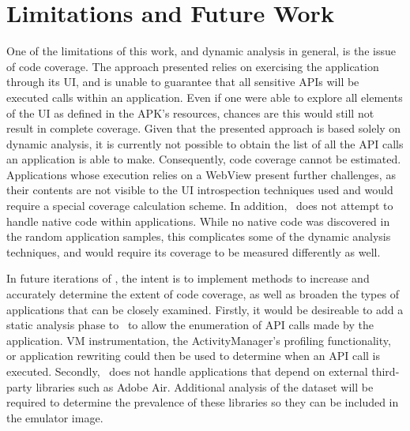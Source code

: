 \chapter{Limitations and Future Work}
\label{sec:future}

One of the limitations of this work, and dynamic analysis in general, is the issue of code coverage.  The approach presented relies on exercising the application through its UI, and is unable to guarantee that all sensitive APIs will be executed calls within an application. Even if one were able to explore all elements of the UI as defined in the APK's resources, chances are this would still not result in complete coverage.  Given that the presented approach is based solely on dynamic analysis, it is currently not possible to obtain the list of all the API calls an application is able to make. Consequently, code coverage cannot be estimated.  Applications whose execution relies on a WebView present further challenges, as their contents are not visible to the UI introspection techniques used and would require a special coverage calculation scheme.  In addition, \toolname~does not attempt to handle native code within applications.  While no native code was discovered in the random application samples, this complicates some of the dynamic analysis techniques, and would require its coverage to be measured differently as well.

In future iterations of \toolname, the intent is to implement methods to increase and accurately determine the extent of code coverage, as well as broaden the types of applications that can be closely examined.  Firstly, it would be desireable to add a static analysis phase to \toolname~to allow the enumeration of API calls made by the application.  VM instrumentation, the ActivityManager's profiling functionality, or application rewriting could then be used to determine when an API call is executed.  Secondly, \toolname~does not handle applications that depend on external third-party libraries such as Adobe Air.  Additional analysis of the dataset will be required to determine the prevalence of these libraries so they can be included in the emulator image.  

